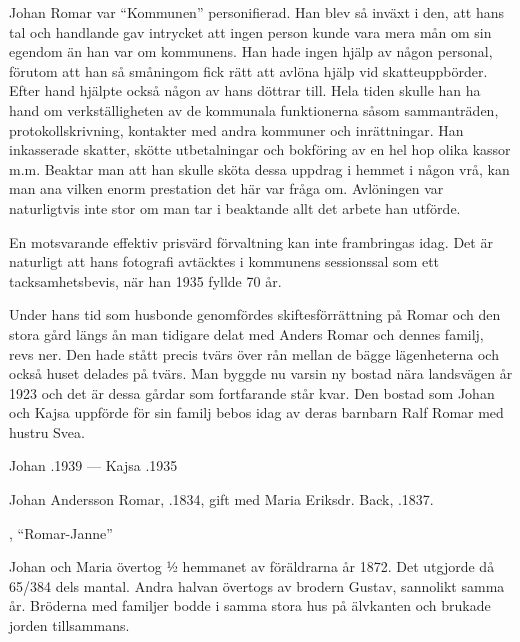 Johan Romar var ``Kommunen'' personifierad. Han blev så inväxt i den, att hans tal och handlande gav intrycket att ingen person kunde vara mera mån om sin egendom än han var om kommunens. Han hade ingen hjälp av någon personal, förutom  att han så småningom fick rätt att avlöna hjälp vid skatteuppbörder. Efter hand hjälpte också någon av hans döttrar till. Hela tiden skulle han ha hand om verkställigheten av de kommunala funktionerna såsom sammanträden, protokollskrivning, kontakter med andra kommuner och inrättningar. Han inkasserade skatter, skötte utbetalningar och bokföring av en hel hop olika kassor m.m. Beaktar man att han skulle sköta dessa uppdrag i hemmet i någon vrå, kan man ana vilken enorm prestation det här var fråga om. Avlöningen var naturligtvis inte stor om man tar i beaktande allt det arbete han utförde.

En motsvarande effektiv prisvärd förvaltning kan inte frambringas idag. Det är naturligt att hans fotografi avtäcktes i kommunens sessionssal som ett tacksamhetsbevis, när han 1935 fyllde 70 år.

Under hans tid som husbonde genomfördes skiftesförrättning på Romar och den stora gård längs ån man tidigare delat med Anders Romar och dennes familj, revs ner. Den hade stått precis tvärs över rån mellan de bägge lägenheterna och också huset delades på tvärs. Man byggde nu varsin ny bostad nära landsvägen år 1923 och det är dessa gårdar som fortfarande står kvar. Den bostad som Johan och Kajsa uppförde för sin familj bebos idag av deras barnbarn Ralf Romar med hustru Svea.

Johan .1939  ---  Kajsa .1935



Johan Andersson Romar, .1834, gift med Maria Eriksdr. Back, .1837.
\begin{jhchildren}
  \item {}
  \item {}, ``Romar-Janne''
  \item {}
\end{jhchildren}
Johan och Maria övertog ½ hemmanet av föräldrarna år 1872. Det utgjorde då 65/384 dels mantal. Andra halvan övertogs av brodern Gustav, sannolikt samma år. Bröderna med familjer bodde i samma stora hus på älvkanten och brukade jorden tillsammans.

